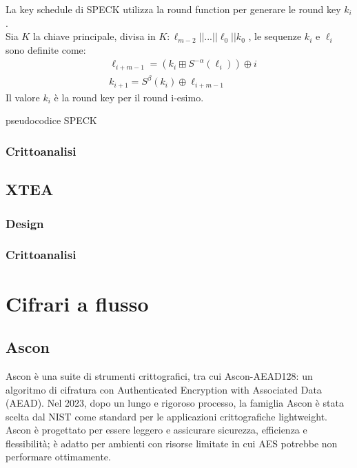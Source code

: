 \documentclass[target=bach,aauheader=,style=]{thud}
\begin{document}
			La key schedule di SPECK utilizza la round function per generare le round key $k_i$.\\
			Sia $K$ la chiave principale, divisa in $K : \ell_{m-2} ||...||\ell_0||k_0$ , le sequenze $k_i$ e $\ell_i$ sono definite come:
			\begin{align*}
				&\ell_{i+m-1} = (k_i \boxplus S^{-\alpha}(\ell_i)) \oplus i\\
				&k_{i+1} = S^{\beta}(k_i) \oplus \ell_{i+m-1}
			\end{align*}
			Il valore $k_i$ è la round key per il round i-esimo.
			\begin{algorithm}
				\caption{pseudocodice SPECK}
				\begin{algorithmic}
					\EndFor
					\EndFor
					\EndProcedure
				\end{algorithmic}
			\end{algorithm}
			
			\subsubsection{Crittoanalisi}
		\subsection{XTEA}
			\subsubsection{Design}
			\subsubsection{Crittoanalisi}
	\section{Cifrari a flusso}
		\subsection{Ascon\cite{ascon}}
		Ascon è una suite di strumenti crittografici, tra cui Ascon-AEAD128: un algoritmo di cifratura con Authenticated Encryption with Associated Data (AEAD). Nel 2023, dopo un lungo e rigoroso processo, la famiglia Ascon è stata scelta dal NIST come standard per le applicazioni crittografiche lightweight.\\
		Ascon è progettato per essere leggero e assicurare sicurezza, efficienza e flessibilità; è adatto per ambienti con risorse limitate in cui AES potrebbe non performare ottimamente\cite{ascon}.
\end{document}
